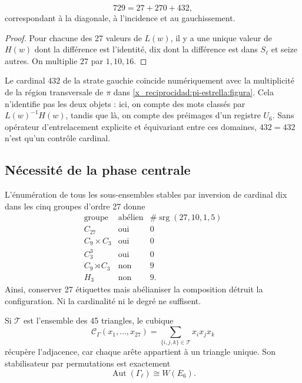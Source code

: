 \begin{theorem}
\label{x_reciprocidad:p12-83-c20-s6:thm:particion-hensel-schlafli-nueva}
\begin{equation}
 729=27+270+432,
 \label{x_reciprocidad:p12-83-c20-s6:eq:particion-729-e6-nueva}
\end{equation}
correspondant à la diagonale, à l’incidence et au gauchissement.
\end{theorem}

\begin{proof}
Pour chacune des 27 valeurs de \(L(w)\), il y a une unique valeur de
\(H(w)\) dont la différence est l’identité, dix dont la différence est dans \(S_\ell\) et
seize autres. On multiplie \(27\) par \(1,10,16\).
\end{proof}

Le cardinal \(432\) de la strate gauchie coïncide numériquement avec la
multiplicité de la région transversale de \(\pi\) dans
\cref{x_reciprocidad:pi-estrella:figura}. Cela n’identifie pas les deux objets : ici,
on compte des mots classés par \(L(w)^{-1}H(w)\), tandis que là,
on compte des préimages d’un registre \(U_6\). Sans opérateur d’entrelacement explicite et
équivariant entre ces domaines, \(432=432\) n’est qu’un contrôle cardinal.

\subsection{Nécessité de la phase centrale}

L’énumération de tous les sous-ensembles stables par inversion de cardinal dix
dans les cinq groupes d’ordre 27 donne
\[
\begin{array}{c|c|c}
\text{groupe}&\text{abélien}&
\#\operatorname{srg}(27,10,1,5)\\ \hline
C_{27}&\text{oui}&0\\
C_9\times C_3&\text{oui}&0\\
C_3^3&\text{oui}&0\\
C_9\rtimes C_3&\text{non}&9\\
H_3&\text{non}&9.
\end{array}
\]
Ainsi, conserver 27 étiquettes mais abélianiser la composition détruit la configuration. Ni la cardinalité ni le degré ne suffisent.

Si \(\mathcal T\) est l’ensemble des 45 triangles, le cubique
\[
 \mathcal C_\Gamma(x_1,\ldots,x_{27})
 =\sum_{\{i,j,k\}\in\mathcal T}x_ix_jx_k
\]
récupère l'adjacence, car chaque arête appartient à un triangle unique. Son stabilisateur par permutations est exactement
\[
 \operatorname{Aut}(\Gamma_\ell)\cong W(E_6).
\]

